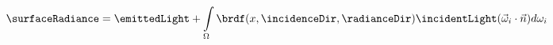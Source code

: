 %
%

\begin{figure}[!htp]
  \begin{equation}
    \surfaceRadiance = \emittedLight +
      \int\limits_{\Omega} \brdf(x, \incidenceDir, \radianceDir)\incidentLight (\vec\omega_i \cdot \vec{n}) d \omega_i
  \end{equation}
  \label{eq:render}
\end{figure}
